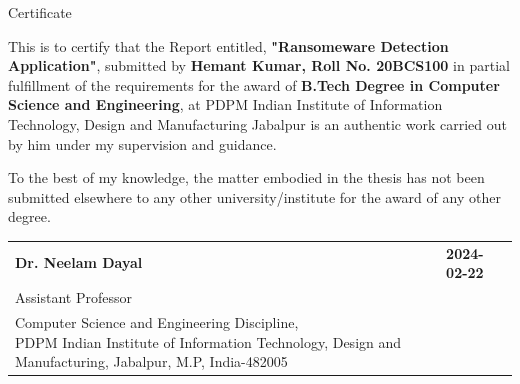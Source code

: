\documentclass[12pt,letterpaper]{article}
\begin{document}
\newpage
    \begin{center}
        \vspace*{1cm}
        
        {\englishtowne \LARGE Certificate}
        
        \vspace{1.2cm}
        
       \large This is to certify that the Report entitled, \textbf{"Ransomeware Detection Application"}, submitted by \textbf{Hemant Kumar, Roll No. 20BCS100} in partial fulfillment of the requirements for the award of \textbf{ B.Tech Degree in Computer Science and Engineering}, at PDPM Indian Institute of Information Technology, Design and Manufacturing Jabalpur is an authentic work carried out by him under my supervision and guidance.
    
    
        To the best of my knowledge, the matter embodied in the thesis has not been submitted elsewhere to any other university/institute for the award of any other degree.
        
        \vfill %

         
    \noindent
    \begin{tabular}{@{}ll@{}}
        \textbf{Dr. Neelam Dayal} & \hfill\textbf{{{2024-02-22}}} \\
        \large Assistant Professor & \\
        \parbox[t]{0.7\textwidth}{%
            Computer Science and Engineering Discipline, \\
            PDPM Indian Institute of Information Technology, Design and Manufacturing, Jabalpur, M.P, India-482005
        }
    \end{tabular}



       \vspace{2cm}
        
    \end{center}
\end{document}
